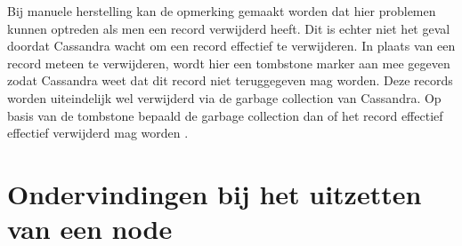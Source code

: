 Bij manuele herstelling kan de opmerking gemaakt worden dat hier problemen kunnen optreden als men een record verwijderd heeft.
Dit is echter niet het geval doordat Cassandra wacht om een record effectief te verwijderen.
In plaats van een record meteen te verwijderen, wordt hier een tombstone marker aan mee gegeven zodat Cassandra weet dat dit record niet teruggegeven mag worden.
Deze records worden uiteindelijk wel verwijderd via de garbage collection van Cassandra.
Op basis van de tombstone bepaald de garbage collection dan of het record effectief effectief verwijderd mag worden \citep{strickland2014availability}.

\section{Ondervindingen bij het uitzetten van een node}